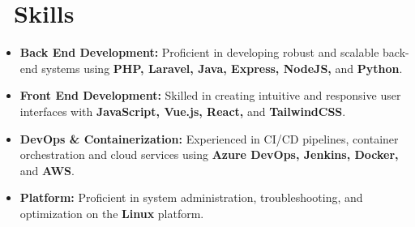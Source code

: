 \documentclass{resume}
\begin{document}



\section{\faCogs\ Skills}
\begin{itemize}[parsep=0.5ex]
  \item \textbf{Back End Development:} Proficient in developing robust and scalable back-end systems using \textbf{PHP, Laravel, Java, Express, NodeJS,} and \textbf{Python}.
  \item \textbf{Front End Development:} Skilled in creating intuitive and responsive user interfaces with \textbf{JavaScript, Vue.js, React,} and \textbf{TailwindCSS}.
  \item \textbf{DevOps \& Containerization:} Experienced in CI/CD pipelines, container orchestration and cloud services using \textbf{Azure DevOps, Jenkins, Docker,} and \textbf{AWS}.
  \item \textbf{Platform:} Proficient in system administration, troubleshooting, and optimization on the \textbf{Linux} platform.
\end{itemize}
\end{document}
